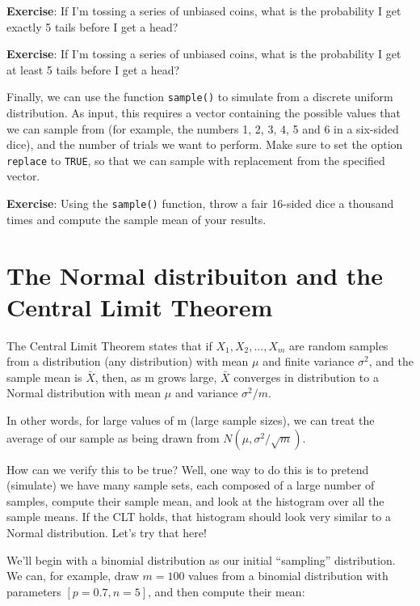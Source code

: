 \documentclass[
]{book}
\begin{document}
\textbf{Exercise}: If I'm tossing a series of unbiased coins, what is the probability I get exactly 5 tails before I get a head?

\textbf{Exercise}: If I'm tossing a series of unbiased coins, what is the probability I get at least 5 tails before I get a head?

Finally, we can use the function \texttt{sample()} to simulate from a discrete uniform distribution. As input, this requires a vector containing the possible values that we can sample from (for example, the numbers 1, 2, 3, 4, 5 and 6 in a six-sided dice), and the number of trials we want to perform. Make sure to set the option \texttt{replace} to \texttt{TRUE}, so that we can sample with replacement from the specified vector.

\textbf{Exercise}: Using the \texttt{sample()} function, throw a fair 16-sided dice a thousand times and compute the sample mean of your results.

\hypertarget{the-normal-distribuiton-and-the-central-limit-theorem}{%
\section{The Normal distribuiton and the Central Limit Theorem}\label{the-normal-distribuiton-and-the-central-limit-theorem}}

The Central Limit Theorem states that if \(X_1, X_2, ..., X_m\) are random samples from a distribution (any distribution) with mean \(\mu\) and finite variance \(\sigma^2\), and the sample mean is \(\bar{X}\), then, as m grows large, \(\bar{X}\) converges in distribution to a Normal distribution with mean \(\mu\) and variance \(\sigma^2 /m\).

In other words, for large values of m (large sample sizes), we can treat the average of our sample as being drawn from \(N(\mu,\sigma^2/\sqrt{m})\).

How can we verify this to be true? Well, one way to do this is to pretend (simulate) we have many sample sets, each composed of a large number of samples, compute their sample mean, and look at the histogram over all the sample means. If the CLT holds, that histogram should look very similar to a Normal distribution. Let's try that here!

We'll begin with a binomial distribution as our initial ``sampling'' distribution. We can, for example, draw \(m=100\) values from a binomial distribution with parameters \([p=0.7,n=5]\), and then compute their mean:
\end{document}
